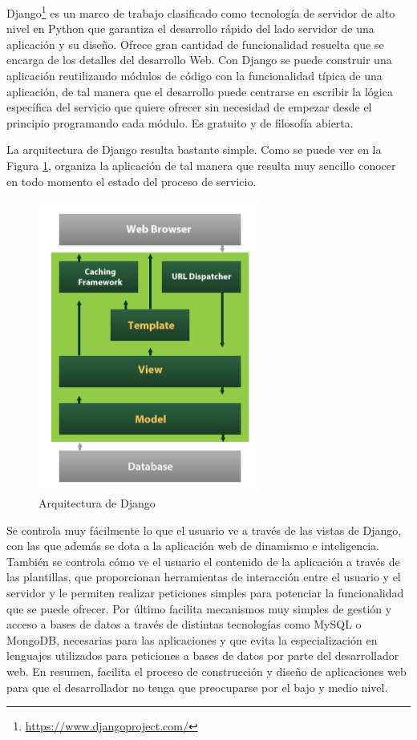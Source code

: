 Django\footnote{\url{https://www.djangoproject.com/}} es un marco de trabajo clasificado como tecnología de servidor de alto nivel en Python que garantiza el desarrollo rápido del lado servidor de una aplicación y su diseño. Ofrece gran cantidad de funcionalidad resuelta que se encarga de los detalles del desarrollo Web. Con Django se puede construir una aplicación reutilizando módulos de código con la funcionalidad típica de una aplicación, de tal manera que el desarrollo puede centrarse en escribir la lógica específica del servicio que quiere ofrecer sin necesidad de empezar desde el principio programando cada módulo. Es gratuito y de filosofía abierta.

La arquitectura de Django resulta bastante simple. Como se puede ver en la Figura \ref{django}, organiza la aplicación de tal manera que resulta muy sencillo conocer en todo momento el estado del proceso de servicio.

\begin{figure}[!hbtp]  \centering\noindent
    \includegraphics[width=0.65\textwidth]{figures/django-arch.png}
    \caption{Arquitectura de Django}
    \label{django}
\end{figure}

Se controla muy fácilmente lo que el usuario ve a través de las vistas de Django, con las que además se dota a la aplicación web de dinamismo e inteligencia. También se controla cómo ve el usuario el contenido de la aplicación a través de las plantillas, que proporcionan herramientas de interacción entre el usuario y el servidor y le permiten realizar peticiones simples para potenciar la funcionalidad que se puede ofrecer. Por último facilita mecanismos muy simples de gestión y acceso a bases de datos a través de distintas tecnologías como MySQL o MongoDB, necesarias para las aplicaciones y que evita la especialización en lenguajes utilizados para peticiones a bases de datos por parte del desarrollador web. En resumen, facilita el proceso de construcción y diseño de aplicaciones web para que el desarrollador no tenga que preocuparse por el bajo y medio nivel.


